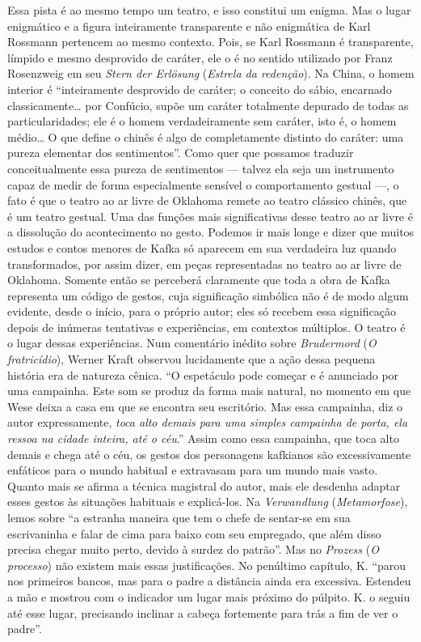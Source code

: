 Essa pista é ao mesmo tempo um teatro, e isso constitui um enigma. Mas o
lugar enigmático e a figura inteiramente transparente e não enigmática
de Karl Rossmann pertencem ao mesmo contexto. Pois, se Karl Rossmann é
transparente, límpido e mesmo desprovido de caráter, ele o é no sentido
utilizado por Franz Rosenzweig em seu \textit{Stern der Erlösung} (\textit{Estrela da
redenção}). Na China, o homem interior é ``inteiramente desprovido de
caráter; o conceito do sábio, encarnado classicamente\ldots{} por Confúcio,
supõe um caráter totalmente depurado de todas as particularidades; ele é
o homem verdadeiramente sem caráter, isto é, o homem médio\ldots{} O que
define o chinês é algo de completamente distinto do caráter: uma pureza
elementar dos sentimentos''. Como quer que possamos traduzir
conceitualmente essa pureza de sentimentos --- talvez ela seja um
instrumento capaz de medir de forma especialmente sensível o
comportamento gestual ---, o fato é que o teatro ao ar livre de Oklahoma
remete ao teatro clássico chinês, que é um teatro gestual. Uma das
funções mais significativas desse teatro ao ar livre é a dissolução do
acontecimento no gesto. Podemos ir mais longe e dizer que muitos estudos
e contos menores de Kafka só aparecem em sua verdadeira luz quando
transformados, por assim dizer, em peças representadas no teatro ao ar
livre de Oklahoma. Somente então se perceberá claramente que toda a obra
de Kafka representa um código de gestos, cuja significação simbólica não
é de modo algum evidente, desde o início, para o próprio autor; eles só
recebem essa significação depois de inúmeras tentativas e experiências,
em contextos múltiplos. O teatro é o lugar dessas experiências. Num
comentário inédito sobre \textit{Brudermord} (\textit{O fratricídio}), Werner Kraft
observou lucidamente que a ação dessa pequena história era de natureza
cênica. ``O espetáculo pode começar e é anunciado por uma campainha.
Este som se produz da forma mais natural, no momento em que Wese deixa a
casa em que se encontra seu escritório. Mas essa campainha, diz o autor
expressamente, \textit{toca alto demais para uma simples campainha de porta,
ela ressoa na cidade inteira, até o céu}.'' Assim como essa campainha,
que toca alto demais e chega até o céu, os gestos dos personagens
kafkianos são excessivamente enfáticos para o mundo habitual e
extravasam para um mundo mais vasto. Quanto mais se afirma a técnica
magistral do autor, mais ele desdenha adaptar esses gestos às situações
habituais e explicá-los. Na \textit{Verwandlung} (\textit{Metamorfose}), lemos sobre
``a estranha maneira que tem o chefe de sentar-se em sua escrivaninha e
falar de cima para baixo com seu empregado, que além disso precisa
chegar muito perto, devido à surdez do patrão''. Mas no \textit{Prozess} (\textit{O
processo}) não existem mais essas justificações. No penúltimo capítulo,
K. ``parou nos primeiros bancos, mas para o padre a distância ainda era
excessiva. Estendeu a mão e mostrou com o indicador um lugar mais
próximo do púlpito. K. o seguiu até esse lugar, precisando inclinar a
cabeça fortemente para trás a fim de ver o padre''.

